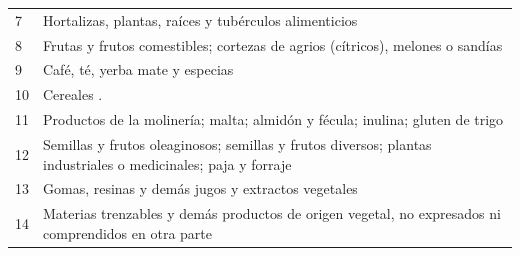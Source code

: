\documentclass[a4paper,openright,12pt]{book}
\begin{document}
\begin{table}[]
{\begin{tabular}{@{}ll@{}}
    7   & Hortalizas, plantas, raíces y tubérculos alimenticios                                                                                                                                                                                                                                          \\
    8   & Frutas y frutos comestibles; cortezas de agrios (cítricos), melones o sandías                                                                                                                                                                                                                  \\
    9   & Café, té, yerba mate y especias                                                                                                                                                                                                                                                                \\
    10  & Cereales .                                                                                                                                                                                                                                                                                     \\
    11  & Productos de la molinería; malta; almidón y fécula; inulina; gluten de trigo                                                                                                                                                                                                                   \\
    12  & Semillas y frutos oleaginosos; semillas y frutos diversos; plantas industriales o medicinales; paja y forraje                                                                                                                                                                                  \\
    13  & Gomas, resinas y demás jugos y extractos vegetales                                                                                                                                                                                                                                             \\
    14  & Materias trenzables y demás productos de origen vegetal, no expresados ni comprendidos en otra parte                                                                                                                                                                                           \\

\end{tabular}}
\end{table}
\end{document}
